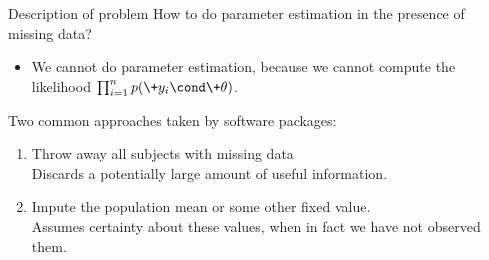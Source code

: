 \documentclass[10pt]{beamer}
\begin{document}
\begin{frame}{Description of problem}
How to do parameter estimation in the presence of missing data? \\
\begin{itemize}
\item[]  \footnotesize  We cannot do parameter estimation,  because we cannot compute the likelihood $\prod_{i=1}^n p(\+y_i \cond \+\theta)$.  \normalsize
\end{itemize}
\vfill \vfill 
Two common approaches taken by software packages:
\begin{enumerate}
\item Throw away all subjects with missing data
\pause  \\
\quad \redx \footnotesize Discards a potentially large amount of useful information.  \normalsize
\pause \\
\item  Impute the population mean or some other fixed value. 
\pause \\
\quad \redx \footnotesize  Assumes certainty about these values,  when in fact we have not observed them.  \normalsize
\end{enumerate}
\end{frame}
\end{document}
